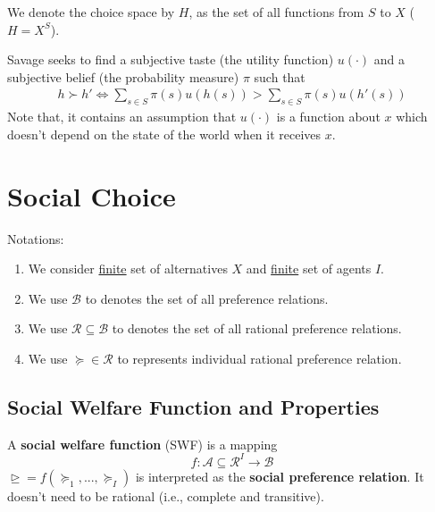 \documentclass[11pt]{elegantbook}
\begin{document}
We denote the choice space by $H$, as the set of all functions from $S$ to $X$ ($H=X^S$).

Savage seeks to find a subjective taste (the utility function) $u(\cdot)$ and a subjective belief (the probability measure) $\pi$ such that
\begin{equation}
    \begin{aligned}
        h\succ h' \Leftrightarrow \sum_{s\in S}\pi(s)u(h(s))>\sum_{s\in S}\pi(s)u(h'(s))
    \end{aligned}
    \nonumber
\end{equation}
Note that, it contains an assumption that $u(\cdot)$ is a function about $x$ which doesn't depend on the state of the world when it receives $x$.



\section{Social Choice}
Notations:
\begin{enumerate}
    \item We consider \underline{finite} set of alternatives $X$ and \underline{finite} set of agents $I$.
    \item We use $\mathcal{B}$ to denotes the set of all preference relations.
    \item We use $\mathcal{R}\subseteq \mathcal{B}$ to denotes the set of all rational preference relations.
    \item We use $\succeq\in \mathcal{R}$ to represents individual rational preference relation.
\end{enumerate}

\subsection{Social Welfare Function and Properties}
\begin{definition}
    \normalfont
    A \textbf{social welfare function} (SWF) is a mapping $$f: \mathcal{A}\subseteq \mathcal{R}^I\rightarrow \mathcal{B}$$
    $\trianglerighteq=f(\succeq_1,...,\succeq_I)$ is interpreted as the \textbf{social preference relation}. It doesn't need to be rational (i.e., complete and transitive).
\end{definition}
\end{document}
